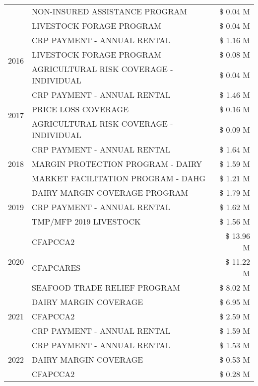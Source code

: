 \begin{tabular}{llr}
 & NON-INSURED ASSISTANCE PROGRAM & \$ 0.04 M \\
 & LIVESTOCK FORAGE PROGRAM & \$ 0.04 M \\
\cline{1-3}
\multirow[t]{3}{*}{2016} & CRP PAYMENT - ANNUAL RENTAL & \$ 1.16 M \\
 & LIVESTOCK FORAGE PROGRAM & \$ 0.08 M \\
 & AGRICULTURAL RISK COVERAGE - INDIVIDUAL & \$ 0.04 M \\
\cline{1-3}
\multirow[t]{3}{*}{2017} & CRP PAYMENT - ANNUAL RENTAL & \$ 1.46 M \\
 & PRICE LOSS COVERAGE & \$ 0.16 M \\
 & AGRICULTURAL RISK COVERAGE - INDIVIDUAL & \$ 0.09 M \\
\cline{1-3}
\multirow[t]{3}{*}{2018} & CRP PAYMENT - ANNUAL RENTAL & \$ 1.64 M \\
 & MARGIN PROTECTION PROGRAM - DAIRY & \$ 1.59 M \\
 & MARKET FACILITATION PROGRAM - DAHG & \$ 1.21 M \\
\cline{1-3}
\multirow[t]{3}{*}{2019} & DAIRY MARGIN COVERAGE PROGRAM & \$ 1.79 M \\
 & CRP PAYMENT - ANNUAL RENTAL & \$ 1.62 M \\
 & TMP/MFP 2019 LIVESTOCK & \$ 1.56 M \\
\cline{1-3}
\multirow[t]{3}{*}{2020} & CFAPCCA2 & \$ 13.96 M \\
 & CFAPCARES & \$ 11.22 M \\
 & SEAFOOD TRADE RELIEF PROGRAM & \$ 8.02 M \\
\cline{1-3}
\multirow[t]{3}{*}{2021} & DAIRY MARGIN COVERAGE & \$ 6.95 M \\
 & CFAPCCA2 & \$ 2.59 M \\
 & CRP PAYMENT - ANNUAL RENTAL & \$ 1.59 M \\
\cline{1-3}
\multirow[t]{3}{*}{2022} & CRP PAYMENT - ANNUAL RENTAL & \$ 1.53 M \\
 & DAIRY MARGIN COVERAGE & \$ 0.53 M \\
 & CFAPCCA2 & \$ 0.28 M \\
\cline{1-3}
\bottomrule
\end{tabular}
